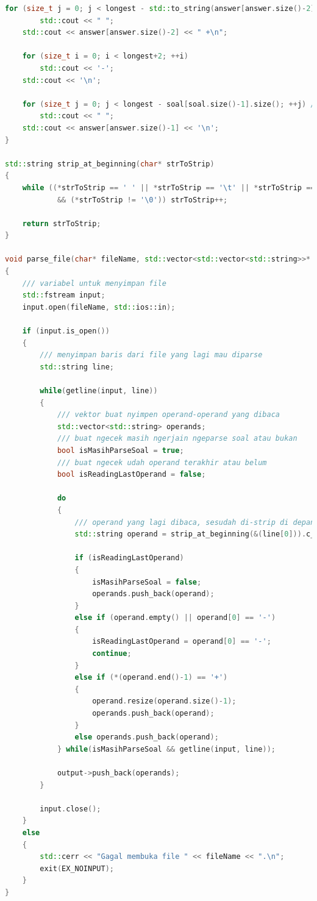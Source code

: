 \documentclass{article}
\begin{document}
\begin{lstlisting}[caption = main.cpp, language = c++]
    for (size_t j = 0; j < longest - std::to_string(answer[answer.size()-2]).size(); ++j) // ngasih spasi
        std::cout << " ";
    std::cout << answer[answer.size()-2] << " +\n";

    for (size_t i = 0; i < longest+2; ++i)
        std::cout << '-';
    std::cout << '\n';

    for (size_t j = 0; j < longest - soal[soal.size()-1].size(); ++j) // ngasih spasi
        std::cout << " ";
    std::cout << answer[answer.size()-1] << '\n';
}

std::string strip_at_beginning(char* strToStrip)
{
    while ((*strToStrip == ' ' || *strToStrip == '\t' || *strToStrip == '\n')
            && (*strToStrip != '\0')) strToStrip++;

    return strToStrip;
}

void parse_file(char* fileName, std::vector<std::vector<std::string>>* output)
{
    /// variabel untuk menyimpan file
    std::fstream input;
    input.open(fileName, std::ios::in);

    if (input.is_open())
    {
        /// menyimpan baris dari file yang lagi mau diparse
        std::string line;

        while(getline(input, line))
        {
            /// vektor buat nyimpen operand-operand yang dibaca
            std::vector<std::string> operands;
            /// buat ngecek masih ngerjain ngeparse soal atau bukan
            bool isMasihParseSoal = true;
            /// buat ngecek udah operand terakhir atau belum
            bool isReadingLastOperand = false;

            do
            {
                /// operand yang lagi dibaca, sesudah di-strip di depan
                std::string operand = strip_at_beginning(&(line[0])).c_str();

                if (isReadingLastOperand)
                {
                    isMasihParseSoal = false;
                    operands.push_back(operand);
                }
                else if (operand.empty() || operand[0] == '-')
                {
                    isReadingLastOperand = operand[0] == '-';
                    continue;
                }
                else if (*(operand.end()-1) == '+')
                {
                    operand.resize(operand.size()-1);
                    operands.push_back(operand);
                }
                else operands.push_back(operand);
            } while(isMasihParseSoal && getline(input, line));

            output->push_back(operands);
        }

        input.close();
    }
    else
    {
        std::cerr << "Gagal membuka file " << fileName << ".\n";
        exit(EX_NOINPUT);
    }
}
\end{lstlisting}
\end{document}
